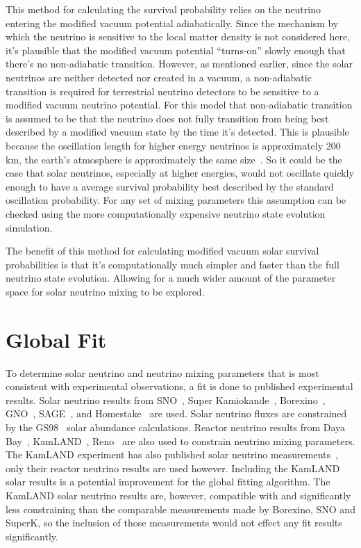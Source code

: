 This method for calculating the survival probability relies
on the neutrino entering the modified vacuum potential adiabatically.
Since the mechanism by which the neutrino is sensitive to the local matter
density is not considered here, it's plausible that the modified
vacuum potential ``turns-on'' slowly enough that there's no non-adiabatic
transition.
However, as mentioned earlier, since the solar neutrinos are neither
detected nor created in a vacuum, a non-adiabatic transition is required
for terrestrial neutrino detectors to be sensitive to a modified vacuum
neutrino potential.
For this model that non-adiabatic transition is assumed to be that the
neutrino does not fully transition from being best described
by a modified vacuum state by the time it's detected.
This is plausible because the oscillation length for higher
energy neutrinos is approximately 200\,km, the earth's atmosphere
is approximately the same size~\citep{atmosphere_profile}.
So it could be the case that solar neutrinos, especially at higher
energies, would not oscillate quickly enough to have a average
survival probability best described by the standard oscillation
probability.
For any set of mixing parameters this assumption can be checked using the
more computationally expensive neutrino state evolution simulation.

The benefit of this method for calculating modified vacuum solar survival
probabilities is that it's computationally much simpler and faster than the full
neutrino state evolution.
Allowing for a much wider amount of the parameter space for solar neutrino
mixing to be explored.

\section{Global Fit}
To determine solar neutrino and neutrino mixing parameters that is most
consistent with experimental observations, a fit is done to published
experimental results.
Solar neutrino results from SNO~\citep{sno_combined}, Super
Kamiokande~\citep{superk4, superk_first_solar,superk2, superk3},
Borexino~\citep{borexino_final_results,borexino_nature}, GNO~\citep{gallex, gno},
SAGE~\citep{sage}, and Homestake~\citep{homestake} are used.
Solar neutrino fluxes are constrained by the GS98~\citep{gs98} solar abundance calculations.
Reactor neutrino results from Daya Bay~\citep{daya_bay}, KamLAND~\citep{kamland_reactor, kamland_data_release}, Reno~\citep{reno}
are also used to constrain neutrino mixing parameters.
The KamLAND experiment has also published solar neutrino
measurements~\citep{kamland_solar, kamland_b8},
only their reactor neutrino results are used however.
Including the KamLAND solar results is a potential improvement for the global fitting
algorithm.
The KamLAND solar neutrino results are, however, compatible with and
significantly less constraining than the comparable measurements made by
Borexino, SNO and SuperK, so the inclusion of those measurements would not
effect any fit results significantly.


